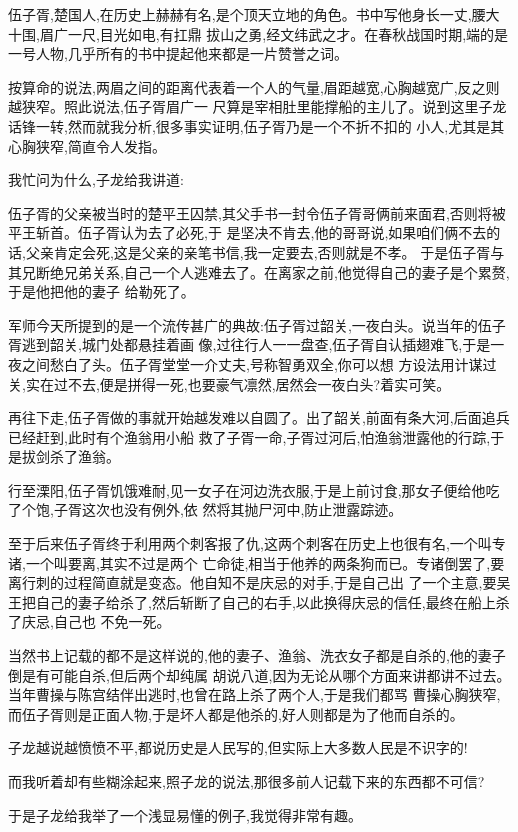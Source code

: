 ﻿\documentclass[12pt,twocolumn]{article}
\begin{document}
伍子胥,楚国人,在历史上赫赫有名,是个顶天立地的角色。书中写他身长一丈,腰大十围,眉广一尺,目光如电,有扛鼎
拔山之勇,经文纬武之才。在春秋战国时期,端的是一号人物,几乎所有的书中提起他来都是一片赞誉之词。

按算命的说法,两眉之间的距离代表着一个人的气量,眉距越宽,心胸越宽广,反之则越狭窄。照此说法,伍子胥眉广一
尺算是宰相肚里能撑船的主儿了。说到这里子龙话锋一转,然而就我分析,很多事实证明,伍子胥乃是一个不折不扣的
小人,尤其是其心胸狭窄,简直令人发指。

我忙问为什么,子龙给我讲道:

伍子胥的父亲被当时的楚平王囚禁,其父手书一封令伍子胥哥俩前来面君,否则将被平王斩首。伍子胥认为去了必死,于
是坚决不肯去,他的哥哥说,如果咱们俩不去的话,父亲肯定会死,这是父亲的亲笔书信,我一定要去,否则就是不孝。
于是伍子胥与其兄断绝兄弟关系,自己一个人逃难去了。在离家之前,他觉得自己的妻子是个累赘,于是他把他的妻子
给勒死了。

军师今天所提到的是一个流传甚广的典故:伍子胥过韶关,一夜白头。说当年的伍子胥逃到韶关,城门处都悬挂着画
像,过往行人一一盘查,伍子胥自认插翅难飞,于是一夜之间愁白了头。伍子胥堂堂一介丈夫,号称智勇双全,你可以想
方设法用计谋过关,实在过不去,便是拼得一死,也要豪气凛然,居然会一夜白头?着实可笑。

再往下走,伍子胥做的事就开始越发难以自圆了。出了韶关,前面有条大河,后面追兵已经赶到,此时有个渔翁用小船
救了子胥一命,子胥过河后,怕渔翁泄露他的行踪,于是拔剑杀了渔翁。

行至溧阳,伍子胥饥饿难耐,见一女子在河边洗衣服,于是上前讨食,那女子便给他吃了个饱,子胥这次也没有例外,依
然将其抛尸河中,防止泄露踪迹。

至于后来伍子胥终于利用两个刺客报了仇,这两个刺客在历史上也很有名,一个叫专诸,一个叫要离,其实不过是两个
亡命徒,相当于他养的两条狗而已。专诸倒罢了,要离行刺的过程简直就是变态。他自知不是庆忌的对手,于是自己出
了一个主意,要吴王把自己的妻子给杀了,然后斩断了自己的右手,以此换得庆忌的信任,最终在船上杀了庆忌,自己也
不免一死。

当然书上记载的都不是这样说的,他的妻子、渔翁、洗衣女子都是自杀的,他的妻子倒是有可能自杀,但后两个却纯属
胡说八道,因为无论从哪个方面来讲都讲不过去。当年曹操与陈宫结伴出逃时,也曾在路上杀了两个人,于是我们都骂
曹操心胸狭窄,而伍子胥则是正面人物,于是坏人都是他杀的,好人则都是为了他而自杀的。

子龙越说越愤愤不平,都说历史是人民写的,但实际上大多数人民是不识字的!

而我听着却有些糊涂起来,照子龙的说法,那很多前人记载下来的东西都不可信?

于是子龙给我举了一个浅显易懂的例子,我觉得非常有趣。
\end{document}
